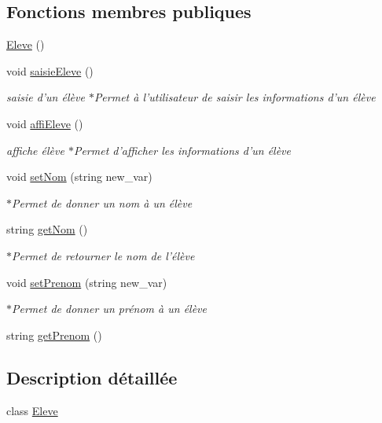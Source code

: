 \subsection*{Fonctions membres publiques}
\begin{DoxyCompactItemize}
\item 
\hyperlink{class_eleve_ac17e7d7daabe4fb88306fe3fe003bdc7}{Eleve} ()
\item 
void \hyperlink{class_eleve_a58dfffa4ec2e1098cca621aca1bc8b01}{saisie\-Eleve} ()
\begin{DoxyCompactList}\small\item\em saisie d'un élève $\ast$\-Permet à l'utilisateur de saisir les informations d'un élève \end{DoxyCompactList}\item 
void \hyperlink{class_eleve_a4c52b8dc64acde0c0f6616773d361e27}{affi\-Eleve} ()
\begin{DoxyCompactList}\small\item\em affiche élève $\ast$\-Permet d'afficher les informations d'un élève \end{DoxyCompactList}\item 
void \hyperlink{class_eleve_a9ae9b9ab1bdad31358aaabfe782ee917}{set\-Nom} (string new\-\_\-var)
\begin{DoxyCompactList}\small\item\em $\ast$\-Permet de donner un nom à un élève \end{DoxyCompactList}\item 
string \hyperlink{class_eleve_abf63239397983c10c4dfea36839aa522}{get\-Nom} ()
\begin{DoxyCompactList}\small\item\em $\ast$\-Permet de retourner le nom de l'élève \end{DoxyCompactList}\item 
void \hyperlink{class_eleve_a204474920420c637c2db34676fa5b6f1}{set\-Prenom} (string new\-\_\-var)
\begin{DoxyCompactList}\small\item\em $\ast$\-Permet de donner un prénom à un élève \end{DoxyCompactList}\item 
string \hyperlink{class_eleve_a306ededf39fac45344ceb81f4591d96f}{get\-Prenom} ()
\end{DoxyCompactItemize}


\subsection{Description détaillée}
class \hyperlink{class_eleve}{Eleve} 

